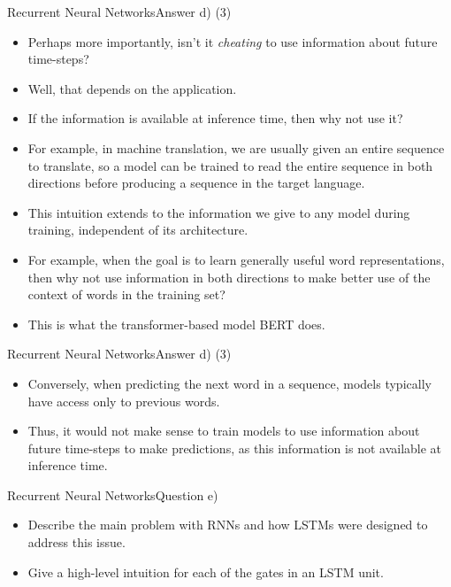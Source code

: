 \documentclass[t]{beamer}
\begin{document}
\begin{frame}{Recurrent Neural Networks}{Answer d) (3)}
    \begin{itemize}
        \item Perhaps more importantly, isn't it \emph{cheating} to use
              information about future time-steps?
        \item Well, that depends on the application.
        \item If the information is available at inference time, then why not
              use it?
        \item For example, in machine translation, we are usually given an
              entire sequence to translate, so a model can be trained to read
              the entire sequence in both directions before producing a sequence
              in the target language.
        \item This intuition extends to the information we give to any model
              during training, independent of its architecture.
        \item For example, when the goal is to learn generally useful word
              representations, then why not use information in both directions
              to make better use of the context of words in the training set?
        \item This is what the transformer-based model BERT does.
    \end{itemize}
\end{frame}

\begin{frame}{Recurrent Neural Networks}{Answer d) (3)}
    \begin{itemize}
        \item Conversely, when predicting the next word in a sequence, models
              typically have access only to previous words.
        \item Thus, it would not make sense to train models to use information
              about future time-steps to make predictions, as this information
              is not available at inference time.
    \end{itemize}
\end{frame}

\begin{frame}{Recurrent Neural Networks}{Question e)}
    \begin{itemize}
        \item Describe the main problem with RNNs and how LSTMs were designed to
              address this issue.
        \item Give a high-level intuition for each of the gates in an LSTM unit.
    \end{itemize}
\end{frame}
\end{document}
